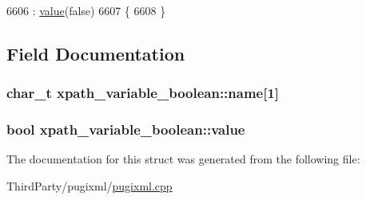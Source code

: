 \begin{DoxyCode}
6606                                 : \hyperlink{structxpath__variable__boolean_ab54117a6cced8c3e029724651df4d404}{value}(\textcolor{keyword}{false})
6607         \{
6608         \}
\end{DoxyCode}


\subsection{Field Documentation}
\hypertarget{structxpath__variable__boolean_a2b2cb81ee5c9a19a667428d08d5bb951}{
\subsubsection[{name}]{\setlength{\rightskip}{0pt plus 5cm}char\-\_\-t xpath\-\_\-variable\-\_\-boolean\-::name\mbox{[}1\mbox{]}}}\label{structxpath__variable__boolean_a2b2cb81ee5c9a19a667428d08d5bb951}
\hypertarget{structxpath__variable__boolean_ab54117a6cced8c3e029724651df4d404}{
\subsubsection[{value}]{\setlength{\rightskip}{0pt plus 5cm}bool xpath\-\_\-variable\-\_\-boolean\-::value}}\label{structxpath__variable__boolean_ab54117a6cced8c3e029724651df4d404}


The documentation for this struct was generated from the following file\-:\begin{DoxyCompactItemize}
\item 
Third\-Party/pugixml/\hyperlink{pugixml_8cpp}{pugixml.\-cpp}\end{DoxyCompactItemize}
